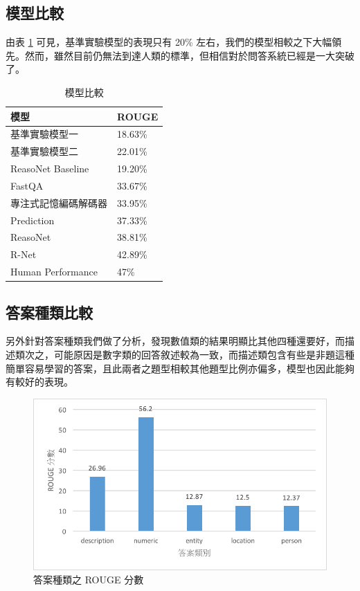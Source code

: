 \subsection{模型比較}
由表 \ref{table:model} 可見，基準實驗模型的表現只有 20\% 左右，我們的模型相較之下大幅領先。然而，雖然目前仍無法到達人類的標準，但相信對於問答系統已經是一大突破了。
\begin{table}
    \caption{模型比較}
    \label{table:model}
    \centering
    \begin{tabular}{|l|l|}
        \hline
        模型 & ROUGE\\
        \hline
        基準實驗模型一 & 18.63\% \\
        \hline
        基準實驗模型二 & 22.01\% \\%
        \hline
        ReasoNet Baseline \cite{shen2016reasonet}& 19.20\% \\
        \hline
        FastQA \cite{weissenborn2017making} & 33.67\% \\
        \hline
        專注式記憶編碼解碼器 &  33.95\% \\ %
        \hline
        Prediction \cite{wang2016machine} & 37.33\% \\
        \hline
        ReasoNet \cite{shen2016reasonet} & 38.81\% \\
        \hline
        R-Net & 42.89\% \\
        \hline
        Human Performance &47\% \\ %
        \hline
    \end{tabular}
\end{table}
\subsection{答案種類比較}
另外針對答案種類我們做了分析，發現數值類的結果明顯比其他四種還要好，而描述類次之，可能原因是數字類的回答敘述較為一致，而描述類包含有些是非題這種簡單容易學習的答案，且此兩者之題型相較其他題型比例亦偏多，模型也因此能夠有較好的表現。%
\begin{figure}
    \centering
    \includegraphics[scale=0.7]{images/chap3_rouge_dist.png}
    \caption{答案種類之 ROUGE 分數}
    \label{fig:rouge_dist}
\end{figure}
